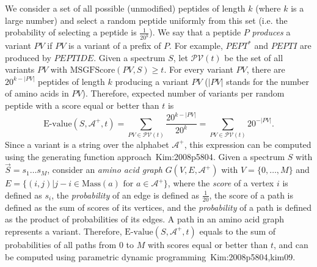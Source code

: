 We consider a set of all possible (unmodified) peptides of length $k$ (where $k$ is a large number) and 
select a random peptide uniformly from this set (i.e. the probability of selecting a peptide is $\frac{1}{20^k}$).
We say that a peptide $P$ {\em produces} a variant $PV$ if $PV$ is a variant of a prefix of $P$.
For example, $PEPT^*$ and $PEPTI$ are produced by $PEPTIDE$.
Given a spectrum $S$, let $\mathcal{PV}(t)$ be the set of all variants $PV$ with $\textrm{MSGFScore}(PV,S) \geq t$.
For every variant $PV$, there are $20^{k-|PV|}$ peptides of length $k$ producing a variant $PV$ ($|PV|$ stands for the number of amino acids in $PV$).
Therefore, expected number of variants per random peptide with a score equal or better than $t$ is
$$
\textrm{E-value}(S,\mathcal{A}^+,t) = \sum_{PV \in \mathcal{PV}(t)}  \frac{20^{k-|PV|}}{20^k} = \sum_{PV \in \mathcal{PV}(t)} 20^{-|PV|}.
$$
Since a variant is a string over the alphabet $\mathcal{A}^+$, this expression can be computed using the generating function approach~\cite{unv}{Kim:2008p5804}.
Given a spectrum $S$ with $\vec{S} = s_1 \ldots s_M$, consider an {\em amino acid graph} $G(V,E,\mathcal{A}^+)$ with $V=\{0,\ldots,M\}$ and $E=\{(i,j) | j-i \in \textrm{Mass}(a) \textrm{ for } a \in \mathcal{A}^+\}$, where the {\em score} of a vertex $i$ is defined as $s_i$, the {\em probability} of an edge is defined as $\frac{1}{20}$, the score of a path is defined as the sum of scores of its vertices, and the {\em probability} of a path is defined as the product of probabilities of its edges.
A path in an amino acid graph represents a variant.
Therefore, $\textrm{E-value}(S,\mathcal{A}^+,t)$ equals to the sum of probabilities of all paths from 0 to $M$ with scores equal or better than $t$, and can be computed using parametric dynamic programming~\cite{unv}{Kim:2008p5804,kim09}.

